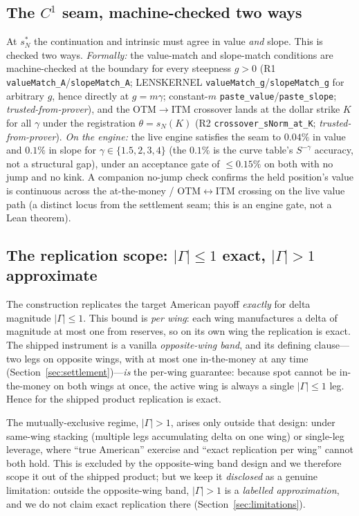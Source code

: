 \documentclass[11pt]{article}
\newcommand{\tfp}{\emph{trusted-from-prover}}
\begin{document}
\subsection{The $C^{1}$ seam, machine-checked two ways}
At $s_{N}^{\ast}$ the continuation and intrinsic must agree in value \emph{and}
slope. This is checked two ways.
\emph{Formally:} the value-match and slope-match conditions are
machine-checked at the boundary for every steepness $g>0$ (R1
\texttt{valueMatch\_A}/\texttt{slopeMatch\_A}; LENSKERNEL
\texttt{valueMatch\_g}/\texttt{slopeMatch\_g} for arbitrary $g$, hence directly at
$g=m\gamma$; constant-$m$ \texttt{paste\_value}/\texttt{paste\_slope}; \tfp{}),
and the OTM$\to$ITM crossover lands at the dollar strike $K$ for all $\gamma$
under the registration $\theta=s_{N}(K)$ (R2 \texttt{crossover\_sNorm\_at\_K};
\tfp{}).
\emph{On the engine:} the live engine satisfies the seam to $0.04\%$ in value and
$0.1\%$ in slope for $\gamma\in\{1.5,2,3,4\}$ (the $0.1\%$ is the curve table's
$S^{-\gamma}$ accuracy, not a structural gap), under an acceptance gate of
$\le 0.15\%$ on both with no jump and no kink. A companion no-jump check confirms
the held position's value is continuous across the at-the-money / OTM$\leftrightarrow$ITM
crossing on the live value path (a distinct locus from the settlement seam; this
is an engine gate, not a Lean theorem).

\subsection{The replication scope: $|\Gamma|\le1$ exact, $|\Gamma|>1$ approximate}
\label{sec:gamma}
The construction replicates the target American payoff \emph{exactly} for delta
magnitude $|\Gamma|\le1$. This bound is \emph{per wing}: each wing manufactures a
delta of magnitude at most one from reserves, so on its own wing the replication
is exact. The shipped instrument is a vanilla \emph{opposite-wing band}, and its
defining clause---two legs on opposite wings, with at most one in-the-money at any
time (Section~\ref{sec:settlement})---\emph{is} the per-wing guarantee: because
spot cannot be in-the-money on both wings at once, the active wing is always a
single $|\Gamma|\le1$ leg. Hence for the shipped product replication is exact.

The mutually-exclusive regime, $|\Gamma|>1$, arises only outside that design:
under same-wing stacking (multiple legs accumulating delta on one wing) or
single-leg leverage, where ``true American'' exercise and ``exact replication per
wing'' cannot both hold. This is excluded by the opposite-wing band design and we
therefore scope it out of the shipped product; but we keep it \emph{disclosed} as
a genuine limitation: outside the opposite-wing band, $|\Gamma|>1$ is a
\emph{labelled approximation}, and we do not claim exact replication there
(Section~\ref{sec:limitations}).
\end{document}
